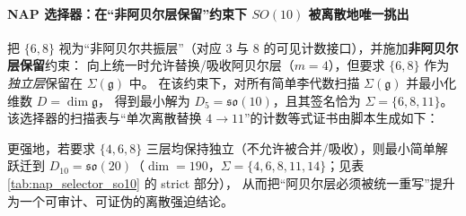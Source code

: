 \paragraph{NAP 选择器：在“非阿贝尔层保留”约束下 \texorpdfstring{$SO(10)$}{SO(10)} 被离散地唯一挑出}
把 \(\{6,8\}\) 视为“非阿贝尔共振层”（对应 \(3\) 与 \(8\) 的可见计数接口），并施加\textbf{非阿贝尔层保留}约束：
向上统一时允许替换/吸收阿贝尔层（\(m=4\)），但要求 \(\{6,8\}\) 作为\emph{独立层}保留在 \(\Sigma(\mathfrak g)\) 中。
在该约束下，对所有简单李代数扫描 \(\Sigma(\mathfrak g)\) 并最小化维数 \(D=\dim\mathfrak g\)，
得到最小解为 \(D_5=\mathfrak{so}(10)\)，且其签名恰为 \(\Sigma=\{6,8,11\}\)。
该选择器的扫描表与“单次离散替换 \(4\to 11\)”的计数等式证书由脚本生成如下：


\par
更强地，若要求 \(\{4,6,8\}\) 三层均保持独立（不允许被合并/吸收），则最小简单解跃迁到 \(D_{10}=\mathfrak{so}(20)\)（\(\dim=190\)，\(\Sigma=\{4,6,8,11,14\}\)；见表 \ref{tab:nap_selector_so10} 的 strict 部分），
从而把“阿贝尔层必须被统一重写”提升为一个可审计、可证伪的离散强迫结论。

